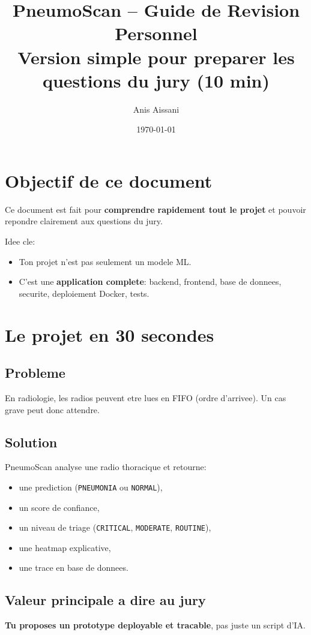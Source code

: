\documentclass[12pt,a4paper]{article}
\title{PneumoScan -- Guide de Revision Personnel\\\large Version simple pour preparer les questions du jury (10 min)}
\author{Anis Aissani}
\date{\today}
\begin{document}
\maketitle
\tableofcontents
\newpage

\section{Objectif de ce document}
Ce document est fait pour \textbf{comprendre rapidement tout le projet} et pouvoir repondre clairement aux questions du jury.

Idee cle:
\begin{itemize}
  \item Ton projet n'est pas seulement un modele ML.
  \item C'est une \textbf{application complete}: backend, frontend, base de donnees, securite, deploiement Docker, tests.
\end{itemize}

\section{Le projet en 30 secondes}
\subsection{Probleme}
En radiologie, les radios peuvent etre lues en FIFO (ordre d'arrivee). Un cas grave peut donc attendre.

\subsection{Solution}
PneumoScan analyse une radio thoracique et retourne:
\begin{itemize}
  \item une prediction (\texttt{PNEUMONIA} ou \texttt{NORMAL}),
  \item un score de confiance,
  \item un niveau de triage (\texttt{CRITICAL}, \texttt{MODERATE}, \texttt{ROUTINE}),
  \item une heatmap explicative,
  \item une trace en base de donnees.
\end{itemize}

\subsection{Valeur principale a dire au jury}
\textbf{Tu proposes un prototype deployable et tracable}, pas juste un script d'IA.
\end{document}
